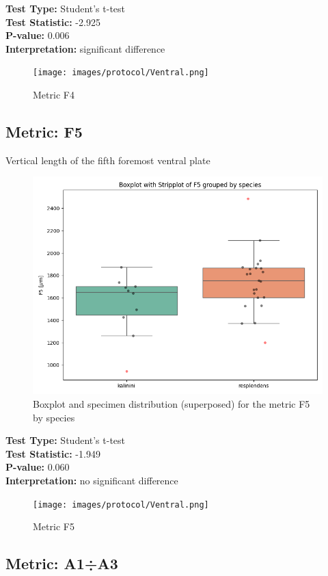 \noindent\textbf{Test Type:} Student's t-test \\
\noindent\textbf{Test Statistic:} -2.925 \\
\noindent\textbf{P-value:} 0.006 \\
\noindent\textbf{Interpretation:} significant difference

\begin{figure}[H]
\centering
\texttt{[image: images/protocol/Ventral.png]}
\caption{ Metric F4}
\end{figure}

\newpage
\subsection*{Metric: F5}

Vertical length of the fifth foremost ventral plate

\begin{figure}[H]
\centering
\includegraphics[width=0.7\linewidth]{images/boxplot/boxplot_F5.png}
\caption{  Boxplot and specimen distribution (superposed) for the metric  F5 by species}
\end{figure}

\noindent\textbf{Test Type:} Student's t-test \\
\noindent\textbf{Test Statistic:} -1.949 \\
\noindent\textbf{P-value:} 0.060 \\
\noindent\textbf{Interpretation:} no significant difference

\begin{figure}[H]
\centering
\texttt{[image: images/protocol/Ventral.png]}
\caption{ Metric F5}
\end{figure}

\newpage
\subsection*{Metric: A1÷A3}


